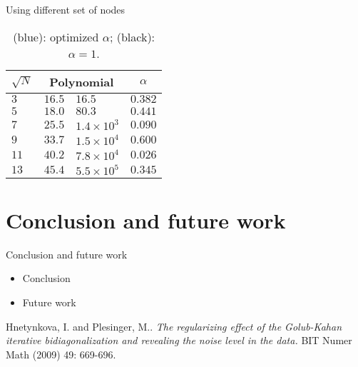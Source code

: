 \documentclass{beamer}
\begin{document}
\begin{frame}{Using different set of nodes}
  \begin{table}[hptb]
    \begin{center}
      \begin{tabular}{l||ll|l}
        \multicolumn{1}{c||}{$\sqrt{N}$} & 
	\multicolumn{2}{c|}{Polynomial} &
	\multicolumn{1}{c}{$\alpha$}\\
        \hline \hline
	$3$ & {\color{blue}$16.5$} & $16.5$ & $0.382$\\
	$5$ & {\color{blue}$18.0$} & $80.3$ & $0.441$\\
	$7$ & {\color{blue}$25.5$} & $1.4\times 10^3$ & $0.090$\\
	$9$ & {\color{blue}$33.7$} & $1.5\times 10^4$ & $0.600$\\
	$11$ & {\color{blue}$40.2$} & $7.8\times 10^4$ & $0.026$\\
	$13$ & {\color{blue}$45.4$} & $5.5\times 10^5$ & $0.345$\\   
      \end{tabular}
    \end{center}
    \caption{{\color{blue}(blue)}: optimized $\alpha$; (black): $\alpha = 1$.}
  \end{table}
\end{frame}

\section{Conclusion and future work}
\begin{frame}{Conclusion and future work}
  \begin{itemize}
    \item Conclusion

    \item Future work
  \end{itemize}
\end{frame}

\begin{thebibliography}{1}
    Hnetynkova, I. and Plesinger, M.. 
    \emph{The regularizing effect of the Golub-Kahan iterative bidiagonalization 
      and revealing the noise level in the data.}
      BIT Numer Math (2009) 49: 669-696.
\end{thebibliography}
\end{document}
